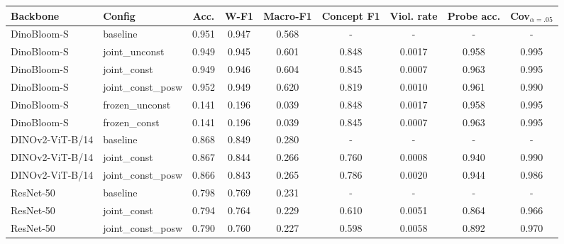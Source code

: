\begin{tabular}{llccccccc}
\toprule
Backbone & Config & Acc. & W-F1 & Macro-F1 & Concept F1 & Viol. rate & Probe acc. & Cov$_{\alpha=.05}$ \\
\midrule
DinoBloom-S & baseline & 0.951 & 0.947 & 0.568 & - & - & - & - \\
DinoBloom-S & joint_unconst & 0.949 & 0.945 & 0.601 & 0.848 & 0.0017 & 0.958 & 0.995 \\
DinoBloom-S & joint_const & 0.949 & 0.946 & 0.604 & 0.845 & 0.0007 & 0.963 & 0.995 \\
DinoBloom-S & joint_const_posw & 0.952 & 0.949 & 0.620 & 0.819 & 0.0010 & 0.961 & 0.990 \\
DinoBloom-S & frozen_unconst & 0.141 & 0.196 & 0.039 & 0.848 & 0.0017 & 0.958 & 0.995 \\
DinoBloom-S & frozen_const & 0.141 & 0.196 & 0.039 & 0.845 & 0.0007 & 0.963 & 0.995 \\
DINOv2-ViT-B/14 & baseline & 0.868 & 0.849 & 0.280 & - & - & - & - \\
DINOv2-ViT-B/14 & joint_const & 0.867 & 0.844 & 0.266 & 0.760 & 0.0008 & 0.940 & 0.990 \\
DINOv2-ViT-B/14 & joint_const_posw & 0.866 & 0.843 & 0.265 & 0.786 & 0.0020 & 0.944 & 0.986 \\
ResNet-50 & baseline & 0.798 & 0.769 & 0.231 & - & - & - & - \\
ResNet-50 & joint_const & 0.794 & 0.764 & 0.229 & 0.610 & 0.0051 & 0.864 & 0.966 \\
ResNet-50 & joint_const_posw & 0.790 & 0.760 & 0.227 & 0.598 & 0.0058 & 0.892 & 0.970 \\
\bottomrule
\end{tabular}
